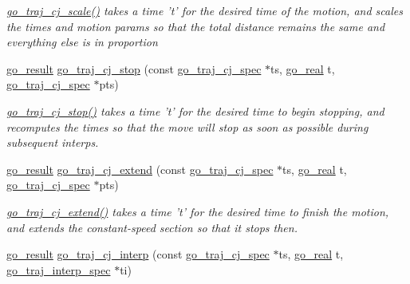 \begin{DoxyCompactItemize}
\begin{DoxyCompactList}\small\item\em \hyperlink{namespacegomotion_a6597fcefe873523be5a8a7a587788b53}{go\-\_\-traj\-\_\-cj\-\_\-scale()} takes a time 't' for the desired time of the motion, and scales the times and motion params so that the total distance remains the same and everything else is in proportion \end{DoxyCompactList}\item 
\hyperlink{gotypes_8h_a55d48b38cd959f63c7e8db8337a9792a}{go\-\_\-result} \hyperlink{namespacegomotion_a0764efa1b4a4385aaf9fe13e0ea7b812}{go\-\_\-traj\-\_\-cj\-\_\-stop} (const \hyperlink{structgomotion_1_1go__traj__cj__spec}{go\-\_\-traj\-\_\-cj\-\_\-spec} $\ast$ts, \hyperlink{gotypes_8h_afd666a2393eebd71ee455846ac9def9b}{go\-\_\-real} t, \hyperlink{structgomotion_1_1go__traj__cj__spec}{go\-\_\-traj\-\_\-cj\-\_\-spec} $\ast$pts)
\begin{DoxyCompactList}\small\item\em \hyperlink{namespacegomotion_a0764efa1b4a4385aaf9fe13e0ea7b812}{go\-\_\-traj\-\_\-cj\-\_\-stop()} takes a time 't' for the desired time to begin stopping, and recomputes the times so that the move will stop as soon as possible during subsequent interps. \end{DoxyCompactList}\item 
\hyperlink{gotypes_8h_a55d48b38cd959f63c7e8db8337a9792a}{go\-\_\-result} \hyperlink{namespacegomotion_ad6229b01a04c2232c7535f600849bb73}{go\-\_\-traj\-\_\-cj\-\_\-extend} (const \hyperlink{structgomotion_1_1go__traj__cj__spec}{go\-\_\-traj\-\_\-cj\-\_\-spec} $\ast$ts, \hyperlink{gotypes_8h_afd666a2393eebd71ee455846ac9def9b}{go\-\_\-real} t, \hyperlink{structgomotion_1_1go__traj__cj__spec}{go\-\_\-traj\-\_\-cj\-\_\-spec} $\ast$pts)
\begin{DoxyCompactList}\small\item\em \hyperlink{namespacegomotion_ad6229b01a04c2232c7535f600849bb73}{go\-\_\-traj\-\_\-cj\-\_\-extend()} takes a time 't' for the desired time to finish the motion, and extends the constant-\/speed section so that it stops then. \end{DoxyCompactList}\item 
\hyperlink{gotypes_8h_a55d48b38cd959f63c7e8db8337a9792a}{go\-\_\-result} \hyperlink{namespacegomotion_a2d66e2943e92ad2df63ae5d008eb8a6c}{go\-\_\-traj\-\_\-cj\-\_\-interp} (const \hyperlink{structgomotion_1_1go__traj__cj__spec}{go\-\_\-traj\-\_\-cj\-\_\-spec} $\ast$ts, \hyperlink{gotypes_8h_afd666a2393eebd71ee455846ac9def9b}{go\-\_\-real} t, \hyperlink{structgomotion_1_1go__traj__interp__spec}{go\-\_\-traj\-\_\-interp\-\_\-spec} $\ast$ti)

\end{DoxyCompactItemize}
